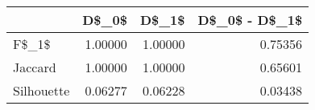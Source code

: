 \begin{table}
\centering
\caption{}
\label{}
\begin{tabular}{lrrr}
\toprule
{} &   D\$\_0\$ &   D\$\_1\$ &  D\$\_0\$ - D\$\_1\$ \\
\midrule
F\$\_1\$      & 1.00000 & 1.00000 &        0.75356 \\
Jaccard    & 1.00000 & 1.00000 &        0.65601 \\
Silhouette & 0.06277 & 0.06228 &        0.03438 \\
\bottomrule
\end{tabular}
\end{table}
